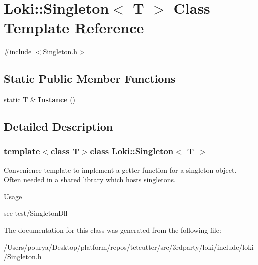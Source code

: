 \hypertarget{classLoki_1_1Singleton}{}\section{Loki\+:\+:Singleton$<$ T $>$ Class Template Reference}
\label{classLoki_1_1Singleton}


{\ttfamily \#include $<$Singleton.\+h$>$}

\subsection*{Static Public Member Functions}
\begin{DoxyCompactItemize}
\item 
\hypertarget{classLoki_1_1Singleton_ab338e9495ecd5ba5ae62110b0f683656}{}static T \& {\bfseries Instance} ()\label{classLoki_1_1Singleton_ab338e9495ecd5ba5ae62110b0f683656}

\end{DoxyCompactItemize}


\subsection{Detailed Description}
\subsubsection*{template$<$class T$>$class Loki\+::\+Singleton$<$ T $>$}

Convenience template to implement a getter function for a singleton object. Often needed in a shared library which hosts singletons.

\begin{DoxyParagraph}{Usage}

\end{DoxyParagraph}
see test/\+Singleton\+Dll 

The documentation for this class was generated from the following file\+:\begin{DoxyCompactItemize}
\item 
/\+Users/pourya/\+Desktop/platform/repos/tetcutter/src/3rdparty/loki/include/loki/Singleton.\+h\end{DoxyCompactItemize}
